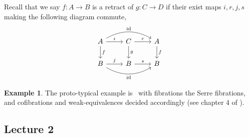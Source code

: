\documentclass{amsart}
\newcommand{\catname}[1]{{\sffamily\upshape{{#1}}}}
\newcommand{\topp}{\catname{Top}}
\DeclareMathOperator{\id}{id} \DeclareMathOperator{\Fun}{Fun}
\theoremstyle{definition}
\newtheorem{example}[theorem]{Example}
\begin{document}
\noindent
Recall that we say $f:A\to B$ is a retract of $g: C\to D$ if their exist maps $i,r, j,s$
making the following diagram commute,
\[
  \begin{tikzcd}
    A \arrow[r, "i"]\arrow[d,"f"]\arrow[rr,bend left=30, "\id"] & C\arrow[r,"r"]\arrow[d,"g"] & A \arrow[d, "f"] \\
    B \arrow[r, "j"] \arrow[rr,bend right=30, "\id"']& B \arrow[r, "s"]& B
  \end{tikzcd}
\]
\begin{example}
  The proto-typical example is \topp \, with fibrations the Serre fibrations,
  and cofibrations and weak-equivalences decided accordingly (see chapter 4 of
  \cite{Hat}).
\end{example}

\subsection{Lecture 2}
\end{document}
